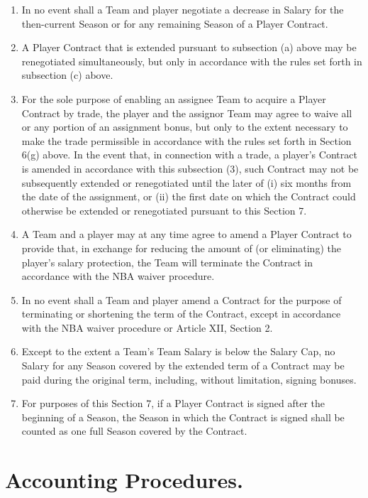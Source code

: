 \documentclass[
]{book}
\providecommand{\tightlist}{%
  \setlength{\itemsep}{0pt}\setlength{\parskip}{0pt}}
\begin{document}
\begin{enumerate}
  \begin{enumerate}
  \def\labelenumii{(\arabic{enumii})}
  \tightlist
  \item
    In no event shall a Team and player negotiate a decrease in Salary for the then-current Season or for any remaining Season of a Player Contract.
  \item
    A Player Contract that is extended pursuant to subsection (a) above may be renegotiated simultaneously, but only in accordance with the rules set forth in subsection (c) above.
  \item
    For the sole purpose of enabling an assignee Team to acquire a Player Contract by trade, the player and the assignor Team may agree to waive all or any portion of an assignment bonus, but only to the extent necessary to make the trade permissible in accordance with the rules set forth in Section 6(g) above. In the event that, in connection with a trade, a player's Contract is amended in accordance with this subsection (3), such Contract may not be subsequently extended or renegotiated until the later of (i) six months from the date of the assignment, or (ii) the first date on which the Contract could otherwise be extended or renegotiated pursuant to this Section 7.
  \item
    A Team and a player may at any time agree to amend a Player Contract to provide that, in exchange for reducing the amount of (or eliminating) the player's salary protection, the Team will terminate the Contract in accordance with the NBA waiver procedure.
  \item
    In no event shall a Team and player amend a Contract for the purpose of terminating or shortening the term of the Contract, except in accordance with the NBA waiver procedure or Article XII, Section 2.
  \item
    Except to the extent a Team's Team Salary is below the Salary Cap, no Salary for any Season covered by the extended term of a Contract may be paid during the original term, including, without limitation, signing bonuses.
  \item
    For purposes of this Section 7, if a Player Contract is signed after the beginning of a Season, the Season in which the Contract is signed shall be counted as one full Season covered by the Contract.
  \end{enumerate}
\end{enumerate}

\hypertarget{accounting-procedures.}{%
\section{Accounting Procedures.}\label{accounting-procedures.}}
\end{document}
